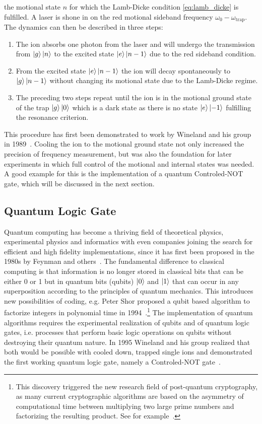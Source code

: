 the motional state $n$ for which the Lamb-Dicke condition \eqref{eq:lamb_dicke}
is fulfilled. A laser is shone in on the red motional sideband frequency $\omega_0 -
\omega_\text{trap}$. The dynamics can then be described in three steps:
\begin{enumerate}[label=\alph*)]
  \item The ion absorbs one photon from the laser and will undergo the
    transmission from $\ket{g}\ket{n}$ to the excited state $\ket{e}\ket{n-1}$
    due to the red sideband condition.
  \item From the excited state $\ket{e}\ket{n-1}$ the ion will decay
    spontaneously to $\ket{g}\ket{n-1}$ without changing its motional state due to the Lamb-Dicke regime.
  \item The preceding two steps repeat until the ion is in the motional ground
    state of the trap $\ket{g}\ket{0}$ which is a dark state as there is no
    state $\ket{e}\ket{-1}$ fulfilling the resonance criterion.
\end{enumerate}

This procedure has first been demonstrated to work by Wineland and his group in
1989~\cite{diedrich1989laser}. Cooling the ion to the motional ground state not
only increased the precision of frequency measurement, but was also the
foundation for later experiments in which full control of the motional and
internal states was needed. A good example for this is the implementation of a
quantum Controled-NOT gate, which will be discussed in the next section.

\subsection{Quantum Logic Gate}
Quantum computing has become a thriving field of theoretical physics,
experimental physics and informatics with even companies joining the search for
efficient and high fidelity implementations, since it has first been proposed in
the 1980s by Feynman and others~\cite{feynman1982simulating}. The fundamental
difference to classical computing is that information is no longer stored in
classical bits that can be either 0 or 1 but in quantum bits (qubits) $\ket{0}$
and $\ket{1}$ that can occur in any superposition according to the
principles of quantum mechanics. This introduces new possibilities of coding,
e.g. Peter Shor proposed a qubit based algorithm to factorize integers in
polynomial time in 1994~\cite{shor1994algorithms}.\footnote{This discovery
triggered the new research field of post-quantum cryptography, as many current
cryptographic algorithms are based on the asymmetry of computational time
between multiplying two large prime numbers and factorizing the resulting
product. See for example~\cite{bernstein2009post}.} The implementation of
quantum algorithms requires the experimental realization of qubits and of
quantum logic gates, i.e. processes that perform basic logic operations on
qubits without destroying their quantum nature. In 1995 Wineland and his group
realized that both would be possible with cooled down, trapped single ions and
demonstrated the first working quantum logic gate, namely a Controled-NOT
gate~\cite{monroe1995demonstration}.

